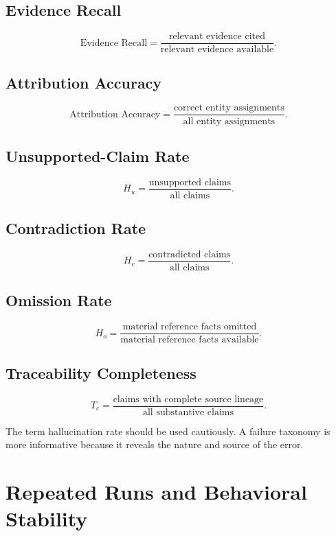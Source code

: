\documentclass[11pt]{report}
\begin{document}
\section{Evidence Recall}

\[
\text{Evidence Recall}
=
\frac{\text{relevant evidence cited}}
     {\text{relevant evidence available}}.
\]

\section{Attribution Accuracy}

\[
\text{Attribution Accuracy}
=
\frac{\text{correct entity assignments}}
     {\text{all entity assignments}}.
\]

\section{Unsupported-Claim Rate}

\[
H_u
=
\frac{\text{unsupported claims}}
     {\text{all claims}}.
\]

\section{Contradiction Rate}

\[
H_c
=
\frac{\text{contradicted claims}}
     {\text{all claims}}.
\]

\section{Omission Rate}

\[
H_o
=
\frac{\text{material reference facts omitted}}
     {\text{material reference facts available}}.
\]

\section{Traceability Completeness}

\[
T_c
=
\frac{\text{claims with complete source lineage}}
     {\text{all substantive claims}}.
\]

The term hallucination rate should be used cautiously. A failure taxonomy is more informative because it reveals the nature and source of the error.

\chapter{Repeated Runs and Behavioral Stability}
\end{document}
